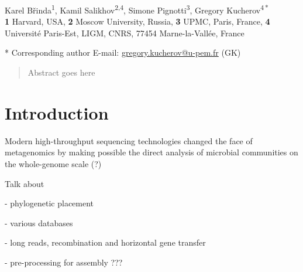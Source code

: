 \documentclass[10pt,letterpaper]{article}
\date{}
\begin{document}
	
\vspace*{0.35in}

\begin{flushleft}	
	
{\Large
	\textbf{}
}
\newline

Karel Břinda\textsuperscript{1},
Kamil Salikhov\textsuperscript{2,4},
Simone Pignotti\textsuperscript{3},
Gregory Kucherov\textsuperscript{4\,*}
\\
\bigskip
\textbf{1} Harvard, USA,
\textbf{2} {Moscow University, Russia},
\textbf{3} {UPMC, Paris, France},
\textbf{4} Université Paris-Est, LIGM, CNRS, 77454 Marne-la-Vallée, France

\bigskip

* Corresponding author\newline
E-mail: \url{gregory.kucherov@u-pem.fr} (GK)

\end{flushleft}	
	
\newcommand{\counter}{C}



% 
\begin{abstract}
Abstract goes here
\end{abstract}

% 
\section{Introduction}
Modern high-throughput sequencing technologies changed the face of
metagenomics by making possible the direct analysis of microbial
communities on the whole-genome scale (?) 

Talk about

- phylogenetic placement

- various databases

- long reads, recombination and horizontal gene transfer

- pre-processing for assembly ???
\end{document}
